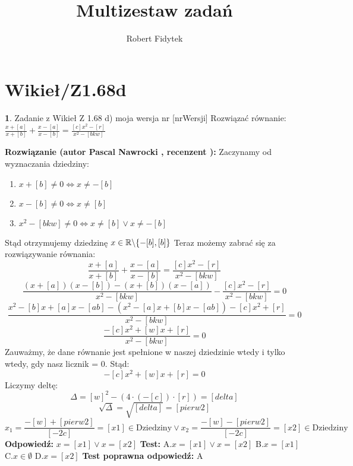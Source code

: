 \documentclass[12pt, a4paper]{article}
\title{Multizestaw zadań}
\author{Robert Fidytek}
\date{}
\theoremstyle{definition} %
\newtheorem{zad}{}
\newcommand{\kategoria}[1]{\section{#1}} %
\newcommand{\zadStart}[1]{\begin{zad}#1\newline} %
\newcommand{\zadStop}{\end{zad}}   %
\newcommand{\rozwStart}[2]{\noindent \textbf{Rozwiązanie (autor #1 , recenzent #2): }\newline} %
\newcommand{\odpStart}{\noindent \textbf{Odpowiedź:}\newline}    %
\newcommand{\odpStop}{\newline}                                             %
\newcommand{\testStart}{\noindent \textbf{Test:}\newline} %
\newcommand{\testStop}{\newline} %
\newcommand{\kluczStart}{\noindent \textbf{Test poprawna odpowiedź:}\newline} %
\newcommand{\kluczStop}{\newline} %
\begin{document}
\maketitle


\kategoria{Wikieł/Z1.68d}
\zadStart{Zadanie z Wikieł Z 1.68 d) moja wersja nr [nrWersji]}
Rozwiązać równanie: $\frac{x+[a]}{x+[b]}+\frac{x-[a]}{x-[b]}=\frac{[c]x^2-[r]}{x^2-[bkw]}$
\zadStop
\rozwStart{Pascal Nawrocki}{}
Zaczynamy od wyznaczania dziedziny:
\begin{enumerate}
\item $x+[b]\neq0 \Leftrightarrow x\neq-[b]$
\item $x-[b] \neq0 \Leftrightarrow x\neq[b]$
\item $x^2-[bkw]\neq0 \Leftrightarrow x\neq[b] \vee x\neq-[b]$
\end{enumerate}
Stąd otrzymujemy dziedzinę $x\in\mathbb{R}\symbol{92}\{-[b],[b]\}$
Teraz możemy zabrać się za rozwiązywanie równania:
$$\frac{x+[a]}{x+[b]}+\frac{x-[a]}{x-[b]}=\frac{[c]x^2-[r]}{x^2-[bkw]}$$
$$\frac{(x+[a])(x-[b])-(x+[b])(x-[a])}{x^2-[bkw]}-\frac{[c]x^2-[r]}{x^2-[bkw]}=0$$
$$\frac{x^2-[b]x+[a]x-[ab]-(x^2-[a]x+[b]x-[ab])-[c]x^2+[r]}{x^2-[bkw]}=0$$
$$\frac{-[c]x^2+[w]x+[r]}{x^2-[bkw]}=0$$
Zauważmy, że dane równanie jest spełnione w naszej dziedzinie wtedy i tylko wtedy, gdy nasz licznik = 0. Stąd:
$$-[c]x^2+[w]x+[r]=0$$
Liczymy deltę:
$$\Delta=[w]^2-(4\cdot(-[c])\cdot[r])=[delta]$$
$$\sqrt{\Delta}=\sqrt{[delta]}=[pierw2]$$
$$x_1=\frac{-[w]+[pierw2]}{[-2c]}=[x1]\in\text{Dziedziny} \vee x_2=\frac{-[w]-[pierw2]}{[-2c]}=[x2]\in\text{Dziedziny}$$
\odpStart
$x=[x1] \vee x=[x2]$
\odpStop
\testStart
A.$x=[x1] \vee x=[x2]$
B.$x=[x1]$
C.$x\in\emptyset$
D.$x=[x2]$
\testStop
\kluczStart
A
\kluczStop
\end{document}

